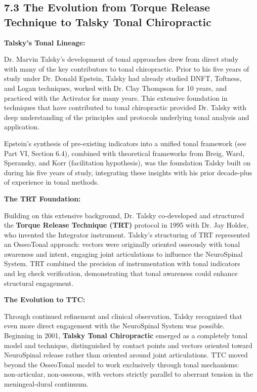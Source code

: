 \documentclass[11pt,letterpaper]{article}
\begin{document}
\subsection{7.3 The Evolution from Torque Release Technique to Talsky Tonal Chiropractic}

\textbf{Talsky's Tonal Lineage:}

Dr. Marvin Talsky's development of tonal approaches drew from direct study with many of the key contributors to tonal chiropractic. Prior to his five years of study under Dr. Donald Epstein, Talsky had already studied DNFT, Toftness, and Logan techniques, worked with Dr. Clay Thompson for 10 years, and practiced with the Activator for many years. This extensive foundation in techniques that have contributed to tonal chiropractic provided Dr. Talsky with deep understanding of the principles and protocols underlying tonal analysis and application.


Epstein's synthesis of pre-existing indicators into a unified tonal framework (see Part VI, Section 6.4), combined with theoretical frameworks from Breig, Ward, Speransky, and Korr (facilitation hypothesis), was the foundation Talsky built on during his five years of study, integrating these insights with his prior decade-plus of experience in tonal methods.


\textbf{The TRT Foundation:}

Building on this extensive background, Dr. Talsky co-developed and structured the \textbf{Torque Release Technique (TRT)} protocol in 1995 with Dr. Jay Holder, who invented the Integrator instrument. Talsky's structuring of TRT represented an OsseoTonal approach: vectors were originally oriented osseously with tonal awareness and intent, engaging joint articulations to influence the NeuroSpinal System. TRT combined the precision of instrumentation with tonal indicators and leg check verification, demonstrating that tonal awareness could enhance structural engagement.


\textbf{The Evolution to TTC:}

Through continued refinement and clinical observation, Talsky recognized that even more direct engagement with the NeuroSpinal System was possible. Beginning in 2001, \textbf{Talsky Tonal Chiropractic} emerged as a completely tonal model and technique, distinguished by contact points and vectors oriented toward NeuroSpinal release rather than oriented around joint articulations. TTC moved beyond the OsseoTonal model to work exclusively through tonal mechanisms: non-articular, non-osseous, with vectors strictly parallel to aberrant tension in the meningeal-dural continuum.
\end{document}
